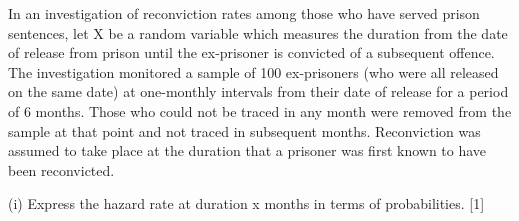 \documentclass[a4paper,12pt]{article}
\begin{document}
In an investigation of reconviction rates among those who have served prison
sentences, let X be a random variable which measures the duration from the date of
release from prison until the ex-prisoner is convicted of a subsequent offence. The
investigation monitored a sample of 100 ex-prisoners (who were all released on the
same date) at one-monthly intervals from their date of release for a period of 6
months. Those who could not be traced in any month were removed from the sample
at that point and not traced in subsequent months. Reconviction was assumed to take
place at the duration that a prisoner was first known to have been reconvicted.

\begin{enuemrate}
\item (i)
Express the hazard rate at duration x months in terms of probabilities.
[1]


\end{enuemrate}
\end{document}
